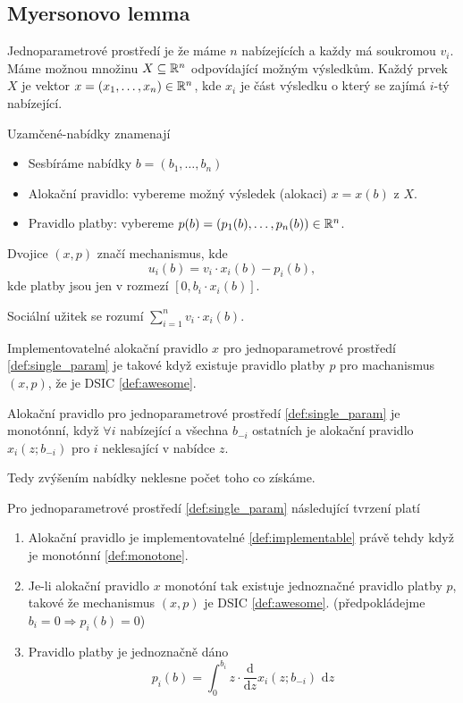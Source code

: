 \subsection{Myersonovo lemma}
\begin{definition}\label{def:single_param}
  Jednoparametrové prostředí je že máme $n$ nabízejících a každy má soukromou $v_i$. 
  Máme možnou množinu $X \subseteq \mathbb{R}^n$ odpovídající možným výsledkům. 
  Každý prvek $X$ je vektor $x = (x_1,\dots,x_n) \in \mathbb{R}^n$, kde $x_i$ je část výsledku o který se zajímá $i$-tý nabízející. 

  Uzamčené-nabídky znamenají
  \begin{itemize}
    \item Sesbíráme nabídky $b = (b_1,\dots,b_n)$
    \item Alokační pravidlo: vybereme možný výsledek (alokaci) $x =x(b)$ z $X$. 
    \item Pravidlo platby: vybereme $p(b)= (p_1(b), \dots,p_n(b)) \in \mathbb{R}^n$. 
  \end{itemize}

  Dvojice $(x,p)$ značí mechanismus, kde 
  \[
    u_i(b) = v_i \cdot x_i(b) - p_i(b), 
  \]
  kde platby jsou jen v rozmezí $[0,b_i \cdot x_i(b)]$.

  Sociální užitek se rozumí $\sum^n_{i=1} v_i \cdot x_i(b)$.
\end{definition}

\begin{definition}\label{def:implementable}
    Implementovatelné alokační pravidlo $x$ pro jednoparametrové prostředí \ref{def:single_param} je takové když existuje pravidlo platby $p$ pro machanismus $(x,p)$, že je DSIC \ref{def:awesome}.
\end{definition}

\begin{definition}\label{def:monotone}
    Alokační pravidlo pro jednoparametrové prostředí \ref{def:single_param} je monotónní, když $\forall i$ nabízející a všechna $b_{-i}$ ostatních je alokační pravidlo $x_i(z;b_{-i})$ pro $i$ neklesající v nabídce $z$. 
\end{definition}
Tedy zvýšením nabídky neklesne počet toho co získáme. 

\begin{theorem}\label{thm:myerson}
    Pro jednoparametrové prostředí \ref{def:single_param} následující tvrzení platí 
    \begin{enumerate}
        \item Alokační pravidlo je implementovatelné \ref{def:implementable} právě tehdy když je monotónní \ref{def:monotone}. 
        \item Je-li alokační pravidlo $x$ monotóní tak existuje jednoznačné pravidlo platby $p$, takové že mechanismus $(x,p)$ je DSIC \ref{def:awesome}. (předpokládejme $b_i = 0 \Rightarrow p_i(b)=0$)
        \item Pravidlo platby je jednoznačně dáno 
            \[
                p_i(b) = \int_0^{b_i} z\cdot \frac{\text{d}}{\text{d}z} x_i(z;b_{-i}) \text{ d}z
            \]
    \end{enumerate}
\end{theorem}

